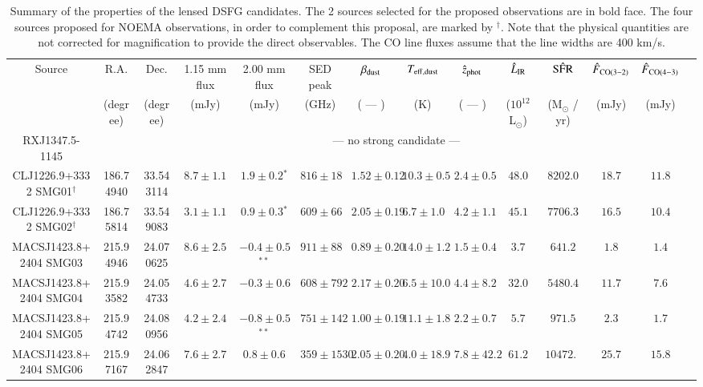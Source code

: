 \documentclass[11pt,a4paper,twoside,graphicx,color]{article}
\begin{document}
\begin{table}[h]
\caption{\footnotesize{Summary of the properties of the lensed DSFG candidates. The 2 sources selected for the proposed observations are in bold face. The four sources proposed for NOEMA observations, in order to complement this proposal, are marked by $^{\dagger}$. Note that the physical quantities are not corrected for magnification to provide the direct observables. The CO line fluxes assume that the line widths are 400 km/s.}}
\begin{center}
\resizebox{\columnwidth}{!} {
\begin{tabular}{c|cccc|ccccccccc}
\hline
\hline
Source & R.A. & Dec. & 1.15 mm flux & 2.00 mm flux & SED peak & $\beta_{\rm dust}$ & $T_{\rm eff,dust}$ & $\hat{z}_{\rm phot}$ & $\hat{L}_{\rm IR}$ & $\hat{\rm SFR}$ & $\hat{F}_{\rm CO(3-2)}$ & $\hat{F}_{\rm CO(4-3)}$ & \\
 & (degree) & (degree) & (mJy) & (mJy) & (GHz) & ( --- ) & (K) & ( --- ) & ($10^{12}$ L$_{\odot}$) & (M$_{\odot}$ / yr) & (mJy) & (mJy) \\
\hline
RXJ1347.5-1145 & \multicolumn{13}{c}{--- no strong candidate ---} \\
\hline
CLJ1226.9+3332 SMG01$^{\dagger}$ & 186.74940 & 33.543114 & $8.7 \pm 1.1$ & $1.9 \pm 0.2$$^{*}$ & $816 \pm 18$ & $1.52 \pm 0.12$ & $10.3 \pm 0.5$ & $2.4 \pm 0.5$ & $48.0$ & $8202.0$ & $18.7$ & $11.8$ \\
CLJ1226.9+3332 SMG02$^{\dagger}$ & 186.75814 & 33.549083 & $3.1 \pm 1.1$ & $0.9 \pm 0.3$$^{*}$ & $609 \pm 66$ & $2.05 \pm 0.19$ & $6.7 \pm 1.0$ & $4.2 \pm 1.1$ & $45.1$ & $7706.3$ & $16.5$ & $10.4$ \\
\hline
MACSJ1423.8+2404 SMG03 & 215.94946 & 24.070625 & $8.6 \pm 2.5$ & $-0.4 \pm 0.5$$^{**}$ & $911 \pm 88$ & $0.89 \pm 0.20$ & $14.0 \pm 1.2$ & $1.5 \pm 0.4$ & $3.7$ & $641.2$ & $1.8$ & $1.4$ \\
MACSJ1423.8+2404 SMG04 & 215.93582 & 24.054733 & $4.6 \pm 2.7$ & $-0.3 \pm 0.6$ & $608 \pm 792$ & $2.17 \pm 0.20$ & $6.5 \pm 10.0$ & $4.4 \pm 8.2$ & $32.0$ & $5480.4$ & $11.7$ & $7.6$ \\
MACSJ1423.8+2404 SMG05 & 215.94742 & 24.080956 & $4.2 \pm 2.4$ & $-0.8 \pm 0.5$$^{**}$ & $751 \pm 142$ & $1.00 \pm 0.19$ & $11.1 \pm 1.8$ & $2.2 \pm 0.7$ & $5.7$ & $971.5$ & $2.3$ & $1.7$ \\
MACSJ1423.8+2404 SMG06 & 215.97167 & 24.062847 & $7.6 \pm 2.7$ & $0.8 \pm 0.6$ & $359 \pm 1530$ & $2.05 \pm 0.20$ & $4.0 \pm 18.9$ & $7.8 \pm 42.2$ & $61.2$ & $10472.3$ & $25.7$ & $15.8$ \\

\end{tabular}}
\end{center}
\end{table}
\end{document}
